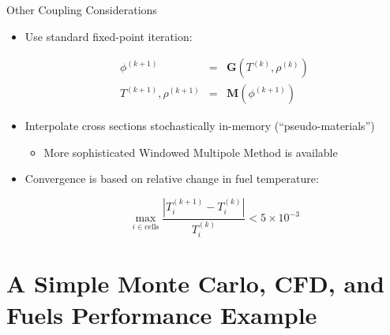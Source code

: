 \documentclass[10pt]{beamer}
\begin{document}
\begin{frame}{Other Coupling Considerations}

\begin{itemize}
\item Use standard fixed-point iteration:

\begin{subequations}
\begin{eqnarray}
\phi^{(k+1)}&=&\textbf{G}\left(T^{(k)},\rho^{(k)}\right)\\
T^{(k+1)}, \rho^{(k+1)}&=&\textbf{M}\left(\phi^{(k+1)}\right)
\end{eqnarray}
\end{subequations}
	\vspace{0.05cm}
\item Interpolate cross sections stochastically in-memory (``pseudo-materials'')
	\begin{itemize}
	\item More sophisticated Windowed Multipole Method is available
	\end{itemize}
	\vspace{0.5cm}
\item Convergence is based on relative change in fuel temperature:

\begin{equation}
\max_{i\in \text{cells}}\frac{|T_{i}^{(k+1)}-T_i^{(k)}|}{T_i^{(k)}}<5\times10^{-3}
\end{equation}
\end{itemize}
\end{frame}

\section{A Simple Monte Carlo, CFD, and Fuels Performance Example}
\end{document}
